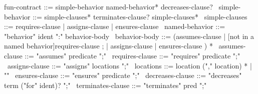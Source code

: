 \begin{syntax}
  fun-contract ::= simple-behavior named-behavior* decreases-clause?
  \
  simple-behavior ::= simple-clauses* terminates-clause? simple-clauses*
  \
  simple-clauses ::= requires-clause | assigns-clause | ensures-clause
  \
  named-behavior ::= "behavior" ident ":" behavior-body
  \
  behavior-body ::= (assumes-clause |
                     {[not in a named behavior]requires-clause} ;
                    | assigns-clause | ensures-clause ) *
              \
  assumes-clause ::= "assumes" predicate ";"
  \
  requires-clause ::= "requires" predicate ";"
  \
  assigns-clause ::= "assigns" locations ";"
  \
  locations ::= location ("," location) * | "\nothing"
  \
  ensures-clause ::= "ensures" predicate ";"
  \
  decreases-clause ::= "decreases" term ("for" ident)? ";"
  \
  terminates-clause ::= "terminates" pred ";"
\end{syntax}
